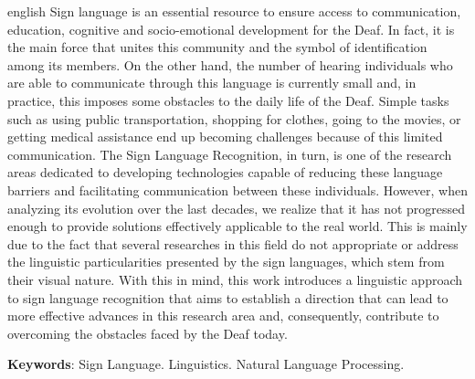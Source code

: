 \begin{resumo}[Abstract]
  \begin{otherlanguage*}{english}
    \noindent
    Sign language is an essential resource to ensure access to communication, education, cognitive and socio-emotional development for the Deaf. In fact, it is the main force that unites this community and the symbol of identification among its members.
    On the other hand, the number of hearing individuals who are able to communicate through this language is currently small and, in practice, this imposes some obstacles to the daily life of the Deaf.
    Simple tasks such as using public transportation, shopping for clothes, going to the movies, or getting medical assistance end up becoming challenges because of this limited communication.
    The Sign Language Recognition, in turn, is one of the research areas dedicated to developing technologies capable of reducing these language barriers and facilitating communication between these individuals.
    However, when analyzing its evolution over the last decades, we realize that it has not progressed enough to provide solutions effectively applicable to the real world.
    This is mainly due to the fact that several researches in this field do not appropriate or address the linguistic particularities presented by the sign languages, which stem from their visual nature.
    With this in mind, this work introduces a linguistic approach to sign language recognition that aims to establish a direction that can lead to more effective advances in this research area and, consequently, contribute to overcoming the obstacles faced by the Deaf today.

    \vspace{\onelineskip}

    \noindent
    \textbf{Keywords}: Sign Language. Linguistics. Natural Language Processing.
  \end{otherlanguage*}
\end{resumo}
